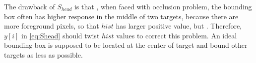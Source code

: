 \documentclass[journal]{IEEEtran}
\begin{document}
The drawback of $S_{head}$ is that , when faced with occlusion problem, the bounding box often has higher response in the middle of two targets, because there are more foreground pixels, so that $hist$ has larger positive value, but . Therefore, $y[i]$ in \eqref{eq:Shead} should twist $hist$ values to correct this problem. An ideal bounding box is supposed to be located at the center of target and bound other targets as less as possible.

\end{document}
